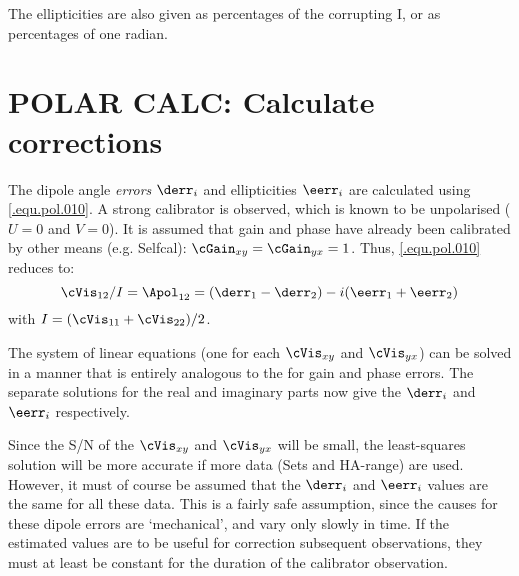 The ellipticities are also given as percentages of the corrupting I, or as
percentages of one radian.


\section{POLAR CALC: Calculate corrections}
\label{.calc}

The dipole angle {\em errors} $\derr_i$ and ellipticities $\eerr_i$ are
calculated using \eqref{.equ.pol.010}. A strong calibrator is observed, which
is known to be unpolarised  ($U=0$ and $V=0$). It is assumed that gain and
phase have already been calibrated by other means (e.g. Selfcal): $\cGain_{xy}
= \cGain_{yx} = 1$. Thus,
\eqref{.equ.pol.010} reduces to:
%
\begin{equation}
  \cVis_{12}/I = \Apol_{12} = (\derr_{1}-\derr_{2})-i(\eerr_{1}+\eerr_{2})
\end{equation}
%
with $I=(\cVis_{11}+\cVis_{22})/2$.

The system of linear equations (one for each $\cVis_{xy}$ and $\cVis_{yx}$) can
be solved in a manner that is entirely analogous to the
 for gain and phase errors. The
separate solutions for the real and imaginary parts now give the $\derr_i$ and
$\eerr_i$ respectively.

Since the S/N of the $\cVis_{xy}$ and $\cVis_{yx}$ will be small, the
least-squares solution will be more accurate if more data (Sets and HA-range)
are used. However, it must of course be assumed that the $\derr_i$ and
$\eerr_i$ values are the same for all these data.  This is a fairly safe
assumption, since the causes for these dipole errors are `mechanical', and vary
only slowly in time. If the estimated values are to be useful for correction
subsequent observations, they must at least be constant for the duration of the
calibrator observation.

